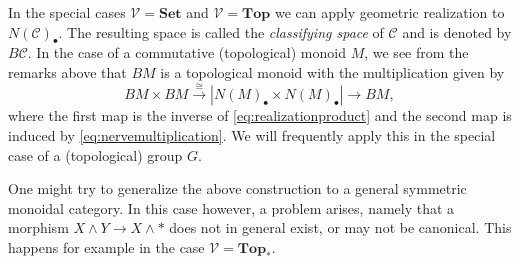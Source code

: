 In the special cases $\mathcal{V} = \mathbf{Set}$ and $\mathcal{V} = \mathbf{Top}$
we can apply geometric realization to $N(\mathcal{C})_\bullet$. The
resulting space is called the \textit{classifying space} of $\mathcal{C}$
and is denoted by $B\mathcal{C}$.
In the case of a commutative (topological) monoid $M$,
we see from the remarks above that
$BM$ is a topological monoid with the multiplication given by
$$BM\times BM\xrightarrow{\cong} |N(M)_\bullet \times N(M)_\bullet|
\to BM,$$
where the first map is the inverse of \eqref{eq:realizationproduct} and the second map
is induced by \eqref{eq:nervemultiplication}. We will frequently apply this
in the special case of a (topological) group $G$.
\begin{rem}
One might try to generalize the above construction to a general
symmetric monoidal category. In this case however, a problem arises,
namely that a morphism $X\wedge Y\to X\wedge \ast$ does not in
general exist, or may not be canonical. This happens for example
in the case $\mathcal{V} = \mathbf{Top}_\ast$.
\end{rem}


